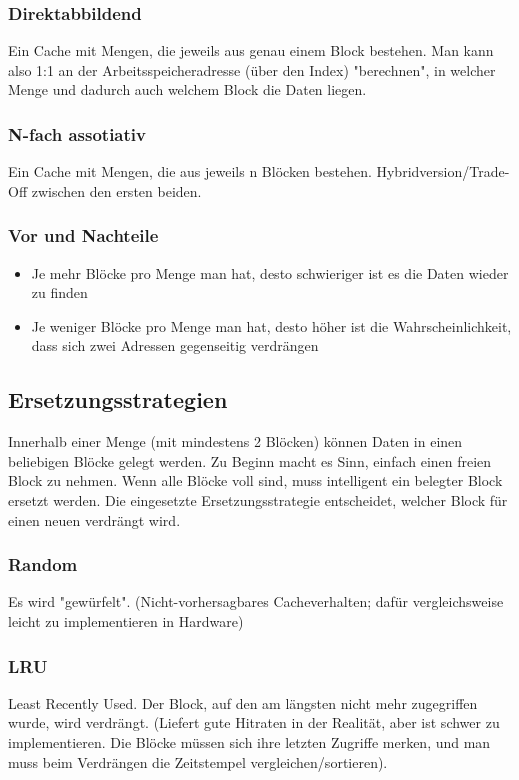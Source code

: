 		\subsubsection{Direktabbildend}
			Ein Cache mit Mengen, die jeweils aus genau einem Block bestehen. Man kann also 1:1 an der Arbeitsspeicheradresse (über den Index) "berechnen", in welcher Menge und dadurch auch welchem Block die Daten liegen.
		\subsubsection{N-fach assotiativ}
			Ein Cache mit Mengen, die aus jeweils n Blöcken bestehen. Hybridversion/Trade-Off zwischen den ersten beiden.
		\subsubsection{Vor und Nachteile} 
		\begin{itemize}
			\item Je mehr Blöcke pro Menge man hat, desto schwieriger ist es die Daten wieder zu finden
			\item Je weniger Blöcke pro Menge man hat, desto höher ist die Wahrscheinlichkeit, dass sich zwei Adressen gegenseitig verdrängen
		\end{itemize}
	\subsection{Ersetzungsstrategien}
			Innerhalb einer Menge (mit mindestens 2 Blöcken) können Daten in einen beliebigen Blöcke gelegt werden. Zu Beginn macht es Sinn, einfach einen freien Block zu nehmen. Wenn alle Blöcke voll sind, muss intelligent ein belegter Block ersetzt werden. Die eingesetzte Ersetzungsstrategie entscheidet, welcher Block für einen neuen verdrängt wird.
		\subsubsection{Random}
			Es wird "gewürfelt". (Nicht-vorhersagbares Cacheverhalten; dafür vergleichsweise leicht zu implementieren in Hardware)
		\subsubsection{LRU}
			Least Recently Used. Der Block, auf den am längsten nicht mehr zugegriffen wurde, wird verdrängt. (Liefert gute Hitraten in der Realität, aber ist schwer zu implementieren. Die Blöcke müssen sich ihre letzten Zugriffe merken, und man muss beim Verdrängen die Zeitstempel vergleichen/sortieren).
